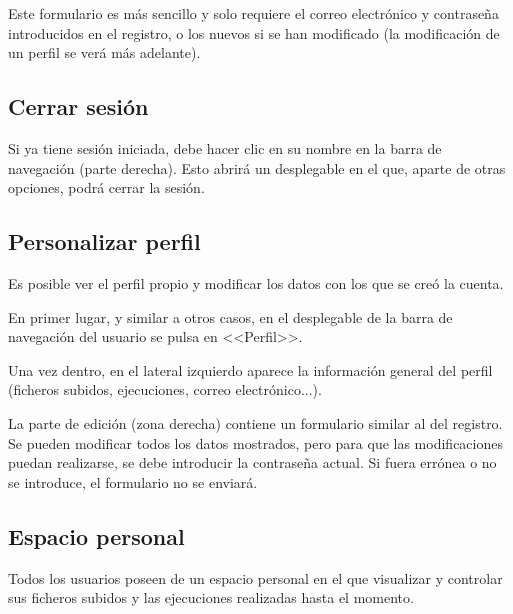 
Este formulario es más sencillo y solo requiere el correo electrónico y
contraseña introducidos en el registro, o los nuevos si se han modificado (la
modificación de un perfil se verá más adelante).

\subsection{Cerrar sesión}

Si ya tiene sesión iniciada, debe hacer clic en su nombre en la barra de
navegación (parte derecha). Esto abrirá un desplegable en el que, aparte de
otras opciones, podrá cerrar la sesión.


\subsection{Personalizar perfil}

Es posible ver el perfil propio y modificar los datos con los que se creó la
cuenta.

En primer lugar, y similar a otros casos, en el desplegable de la barra de
navegación del usuario se pulsa en <<Perfil>>.


Una vez dentro, en el lateral izquierdo aparece la información general del
perfil (ficheros subidos, ejecuciones, correo electrónico...).

La parte de edición (zona derecha) contiene un formulario similar al del
registro. Se pueden modificar todos los datos mostrados, pero para que las
modificaciones puedan realizarse, se debe introducir la contraseña actual. Si
fuera errónea o no se introduce, el formulario no se enviará.

\label{mu:perfil}

\subsection{Espacio personal}

Todos los usuarios poseen de un espacio personal en el que visualizar y
controlar sus ficheros subidos y las ejecuciones realizadas hasta el momento.

